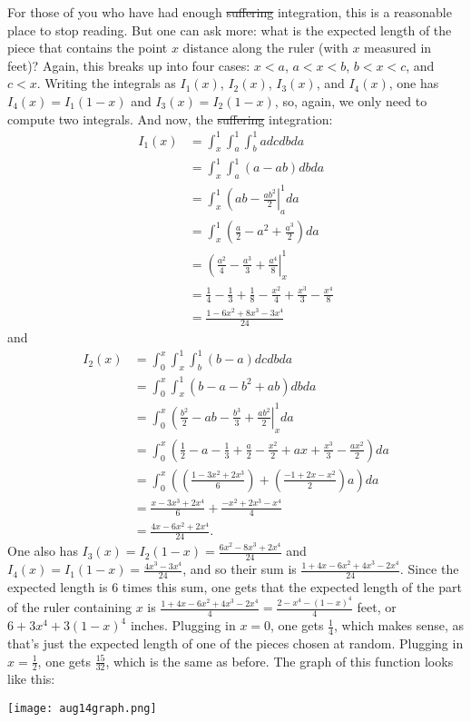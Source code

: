 \documentclass[11pt]{article}
\theoremstyle{definition}
\begin{document}
For those of you who have had enough \sout{suffering} integration, this is a reasonable place to stop reading.  But one can ask more: what is the expected length of the piece that contains the point $x$ distance along the ruler (with $x$ measured in feet)?  Again, this breaks up into four cases: $x < a$, $ a < x < b$, $b < x < c$, and $c < x$.  Writing the integrals as $I_1(x)$, $I_2(x)$, $I_3(x)$, and $I_4(x)$, one has $I_4(x) = I_1(1-x)$ and $I_3(x) = I_2(1-x)$, so, again, we only need to compute two integrals.  And now, the \sout{suffering} integration:
\begin{align*}
I_1(x) & = \int_x^1 \int_a^1 \int_b^1 adcdbda \\
& = \int_{x}^1 \int_a^1 (a-ab)dbda \\
& = \int_{x}^1 \left(ab - \frac{ab^2}{2}\right|_a^1 da \\
& = \int_{x}^1 \left(\frac{a}{2} - a^2 + \frac{a^3}{2}\right)da \\
& = \left(\frac{a^2}{4} - \frac{a^3}{3} + \frac{a^4}{8}\right|_{x}^1 \\
& = \frac{1}{4} - \frac{1}{3} + \frac{1}{8} - \frac{x^2}{4} + \frac{x^3}{3} - \frac{x^4}{8} \\
& = \frac{1-6x^2 + 8x^3 - 3x^4}{24}
\end{align*}
and
\begin{align*}
I_2(x) & = \int_0^{x} \int_{x}^1 \int_b^1 (b-a)dcdbda \\
& = \int_0^{x} \int_{x}^1 (b-a-b^2+ab)dbda \\
& = \int_0^{x} \left(\frac{b^2}{2} - ab - \frac{b^3}{3} + \frac{ab^2}{2}\right|_{x}^1 da \\
& = \int_0^x\left(\frac{1}{2} - a - \frac{1}{3} + \frac{a}{2} -\frac{x^2}{2} + ax + \frac{x^3}{3} - \frac{ax^2}{2}\right)da \\
& = \int_0^x\left(\left(\frac{1-3x^2+2x^3}{6}\right) + \left(\frac{-1+2x-x^2}{2}\right)a\right)da \\
& = \frac{x - 3x^3 + 2x^4}{6} + \frac{-x^2 + 2x^3 - x^4}{4} \\
& = \frac{4x - 6x^2 + 2x^4}{24}.
\end{align*}
One also has $I_3(x) = I_2(1-x) = \frac{6x^2 - 8x^3 + 2x^4}{24}$ and $I_4(x) = I_1(1-x) = \frac{4x^3 - 3x^4}{24}$, and so their sum is $\frac{1 + 4x-6x^2+4x^3-2x^4}{24}$.  Since the expected length is $6$ times this sum, one gets that the expected length of the part of the ruler containing $x$ is $\frac{1 + 4x-6x^2+4x^3-2x^4}{4} = \frac{2-x^4-(1-x)^4}{4}$ feet, or $6 + 3x^4 + 3(1-x)^4$ inches.  Plugging in $x = 0$, one gets $\frac{1}{4}$, which makes sense, as that's just the expected length of one of the pieces chosen at random.  Plugging in $x = \frac{1}{2}$, one gets $\frac{15}{32}$, which is the same as before.  The graph of this function looks like this:

\texttt{[image: aug14graph.png]}
\end{document}
